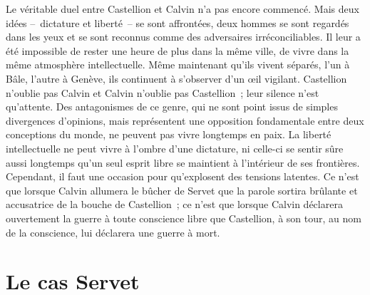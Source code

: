 \documentclass[french,twoside]{book} %
\newcommand{\astermono}{\medskip\centerline{\color{rubric}\large\selectfont{\syms ✻}}\medskip\par}%
\newcommand\chapteropen{} %
\newcommand\chapterclose{} %
\begin{document}
\astermono

\noindent Le véritable duel entre Castellion et Calvin n’a pas encore commencé. Mais deux idées – dictature et liberté – se sont affrontées, deux hommes se sont regardés dans les yeux et se sont reconnus comme des adversaires irréconciliables. Il leur a été impossible de rester une heure de plus dans la même ville, de vivre dans la même atmosphère intellectuelle. Même maintenant qu’ils vivent séparés, l’un à Bâle, l’autre à Genève, ils continuent à s’observer d’un œil vigilant. Castellion n’oublie pas Calvin et Calvin n’oublie pas Castellion ; leur silence n’est qu’attente. Des antagonismes de ce genre, qui ne sont point issus de simples divergences d’opinions, mais représentent une opposition fondamentale entre deux conceptions du monde, ne peuvent pas vivre longtemps en paix. La liberté intellectuelle ne peut vivre à l’ombre d’une dictature, ni celle-ci se sentir sûre aussi longtemps qu’un seul esprit libre se maintient à l’intérieur de ses frontières. Cependant, il faut une occasion pour qu’explosent des tensions latentes. Ce n’est que lorsque Calvin allumera le bûcher de Servet que la parole sortira brûlante et accusatrice de la bouche de Castellion ; ce n’est que lorsque Calvin déclarera ouvertement la guerre à toute conscience libre que Castellion, à son tour, au nom de la conscience, lui déclarera une guerre à mort.
\chapterclose


\chapteropen
\chapter[{Le cas Servet}]{Le cas Servet}\renewcommand{\leftmark}{Le cas Servet}
\end{document}
